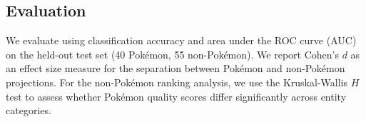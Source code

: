 \subsection{Evaluation}
\label{sec:evaluation}

We evaluate using classification accuracy and area under the ROC curve (AUC) on the held-out test set (40 Pok\'{e}mon, 55 non-Pok\'{e}mon). We report Cohen's $d$ as an effect size measure for the separation between Pok\'{e}mon and non-Pok\'{e}mon projections. For the non-Pok\'{e}mon ranking analysis, we use the Kruskal-Wallis $H$ test to assess whether Pok\'{e}mon quality scores differ significantly across entity categories.